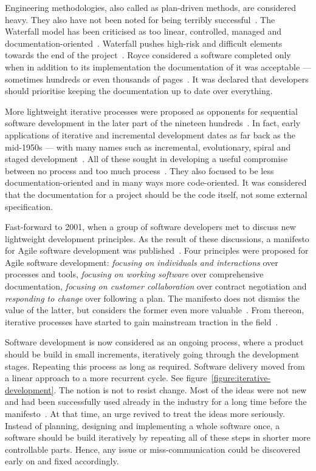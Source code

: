 \documentclass[english]{tktltiki2}
\begin{document}
Engineering methodologies, also called as plan-driven methods, are considered heavy. They also have not been noted for being terribly successful~\cite{Fow05}. The Waterfall model has been criticised as too linear, controlled, managed and documentation-oriented~\cite{Boe88, LB03, Fow05}. Waterfall pushes high-risk and difficult elements towards the end of the project~\cite{VB09}. Royce considered a software completed only when in addition to its implementation the documentation of it was acceptable — sometimes hundreds or even thousands of pages~\cite{Roy70}. It was declared that developers should prioritise keeping the documentation up to date over everything.

More lightweight iterative processes were proposed as opponents for sequential software development in the later part of the nineteen hundreds~\cite{LB03}. In fact, early applications of iterative and incremental development dates as far back as the mid-1950s — with many names such as incremental, evolutionary, spiral and staged development~\cite{Boe88, LB03, Fow05}. All of these sought in developing a useful compromise between no process and too much process~\cite{Fow05}. They also focused to be less documentation-oriented and in many ways more code-oriented. It was considered that the documentation for a project should be the code itself, not some external specification.

Fast-forward to 2001, when a group of software developers met to discuss new lightweight development principles. As the result of these discussions, a manifesto for Agile software development was published~\cite{BBB01a}. Four principles were proposed for Agile software development: \emph{focusing on individuals and interactions} over processes and tools, \emph{focusing on working software} over comprehensive documentation, \emph{focusing on customer collaboration} over contract negotiation and \emph{responding to change} over following a plan. The manifesto does not dismiss the value of the latter, but considers the former even more valuable~\cite{BBB01a}. From thereon, iterative processes have started to gain mainstream traction in the field~\cite{LB03, Fow05}.

Software development is now considered as an ongoing process, where a product should be build in small increments, iteratively going through the development stages. Repeating this process as long as required. Software delivery moved from a linear approach to a more recurrent cycle. See figure~\ref{figure:iterative-development}. The notion is not to resist change. Most of the ideas were not new and had been successfully used already in the industry for a long time before the manifesto~\cite{Fow05}. At that time, an urge revived to treat the ideas more seriously. Instead of planning, designing and implementing a whole software once, a software should be build iteratively by repeating all of these steps in shorter more controllable parts. Hence, any issue or miss-communication could be discovered early on and fixed accordingly.
\end{document}
